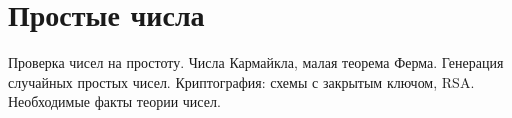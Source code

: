 \section{Простые числа}
Проверка чисел на простоту.
Числа Кармайкла, малая теорема Ферма.
Генерация случайных простых чисел.
Криптография: схемы с закрытым ключом, RSA.
Необходимые факты теории чисел.
